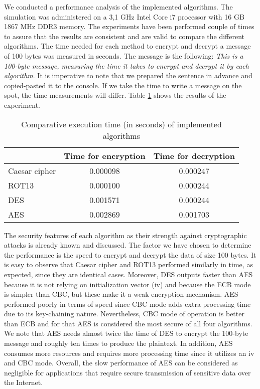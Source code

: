 We conducted a performance analysis of the implemented algorithms. The simulation was administered on a 3,1 GHz Intel Core i7 processor with 16 GB 1867 MHz DDR3 memory. The experiments have been performed couple of times to assure that the results are consistent and are valid to compare the different algorithms. The time needed for each method to encrypt and decrypt a message of 100 bytes was measured in seconds. The message is the following: \textit{This is a 100-byte message, measuring the time it takes to encrypt and decrypt it by each algorithm}. It is imperative to note that we prepared the sentence in advance and copied-pasted it to the console. If we take the time to write a message on the spot, the time measurements will differ. Table \ref{results} shows the results of the experiment. 

\begin{table}[h!]
\begin{tabular}{|l|c|c|}
\hline
\multicolumn{1}{|c|}{} & Time for encryption & \multicolumn{1}{l|}{Time for decryption} \\ \hline
Caesar cipher & 0.000098 & 0.000247 \\ \hline
ROT13 & 0.000100 & 0.000244 \\ \hline
DES & 0.001571 & 0.000244 \\ \hline
AES & 0.002869 & 0.001703 \\ \hline
\end{tabular}
\caption{Comparative execution time (in seconds) of implemented algorithms}
\label{results}
\end{table}


The security features of each algorithm as their strength against cryptographic attacks is already known and discussed. The factor we have chosen to determine the performance is the speed to encrypt and decrypt the data of size 100 bytes. It is easy to observe that Caesar cipher and ROT13 performed similarly in time, as expected, since they are identical cases. Moreover, DES outputs faster than AES because it is not relying on initialization vector (iv) and because the ECB mode is simpler than CBC, but these make it a weak encryption mechanism. AES performed poorly in terms of speed since CBC mode adds extra processing time due to its key-chaining nature. Nevertheless, CBC mode of operation is better than ECB and for that AES is considered the most secure of all four algorithms. We note that AES needs almost twice the time of DES to encrypt the 100-byte message and roughly ten times to produce the plaintext. In addition, AES consumes more resources and requires more processing time since it utilizes an iv and CBC mode. Overall, the slow performance of AES can be considered as negligible for applications that require secure transmission of sensitive data over the Internet.

